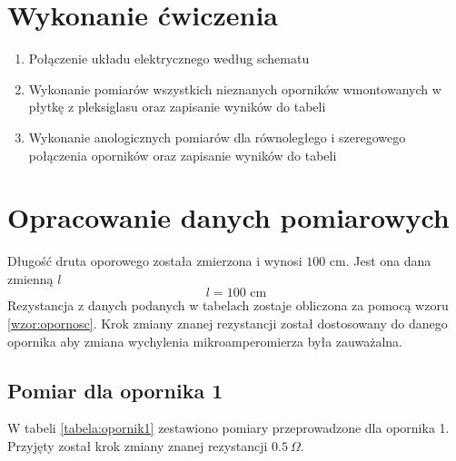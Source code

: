 \documentclass[a4paper,12pts]{article}
\begin{document}


	\section{Wykonanie ćwiczenia}
	
	\begin{enumerate}
		\item Połączenie układu elektrycznego według schematu
		\item Wykonanie pomiarów wszystkich nieznanych oporników wmontowanych w płytkę z pleksiglasu oraz zapisanie wyników do tabeli
		\item Wykonanie anologicznych pomiarów dla równoległego i szeregowego połączenia oporników oraz zapisanie wyników do tabeli
	\end{enumerate}

	
	\section{Opracowanie danych pomiarowych}
Długość druta oporowego została zmierzona i wynosi $100$ cm. Jest ona dana zmienną $l$
\begin{equation}
l = 100 \textrm{ cm}
\end{equation}
Rezystancja z danych podanych w tabelach zostaje obliczona za pomocą wzoru \ref{wzor:opornosc}. Krok zmiany znanej rezystancji został dostosowany do danego opornika aby zmiana wychylenia mikroamperomierza była zauważalna.

\subsection{Pomiar dla opornika 1}
W tabeli \ref{tabela:opornik1} zestawiono pomiary przeprowadzone dla opornika 1. Przyjęty został krok zmiany znanej rezystancji $0.5 ~\Omega$.

\begin{table}[!h]
	\centering
	\caption{Wyniki pomiarów dla opornika nr 1}
	\label{tabela:opornik1}
\end{table}
\end{document}
